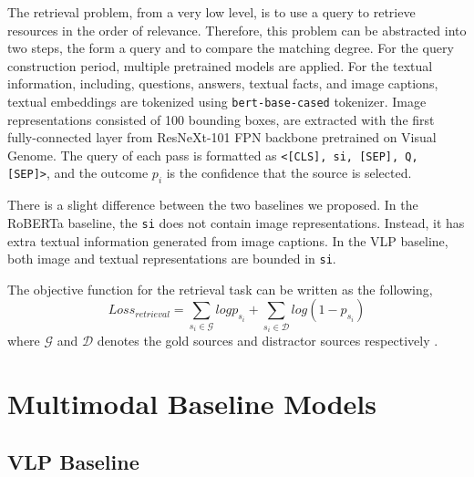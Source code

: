 \documentclass[nohyperref]{article}
\theoremstyle{plain}
\theoremstyle{definition}
\theoremstyle{remark}
\begin{document}
The retrieval problem, from a very low level, is to use a query to retrieve resources in the order of relevance. Therefore, this problem can be abstracted into two steps, the form a query and to compare the matching degree. For the query construction period, multiple pretrained models are applied. For the textual information, including, questions, answers, textual facts, and image captions, textual embeddings are tokenized using \texttt{bert-base-cased} tokenizer\cite{BERT}. Image representations consisted of 100 bounding boxes, are extracted with the first fully-connected layer from ResNeXt-101 FPN backbone pretrained on Visual Genome\cite{visualgenome}. The query of each pass is formatted as \texttt{<[CLS], si, [SEP], Q, [SEP]>}, and the outcome $p_i$ is the confidence that the source is selected.

There is a slight difference between the two baselines we proposed. In the RoBERTa baseline, the \texttt{si} does not contain image representations. Instead, it has extra textual information generated from image captions. In the VLP baseline, both image and textual representations are bounded in \texttt{si}.

The objective function for the retrieval task can be written as the following,
\begin{equation}
Loss_{retrieval}=\sum_{s_i\in\mathcal{G}}logp_{s_i}+\sum_{s_i\in\mathcal{D}}log(1-p_{s_i})
\end{equation}
where $\mathcal{G}$ and $\mathcal{D}$ denotes the gold sources and distractor sources respectively \cite{webqa}.


\section{Multimodal Baseline Models}\label{sec:baseline}

\subsection{VLP Baseline}
\end{document}
